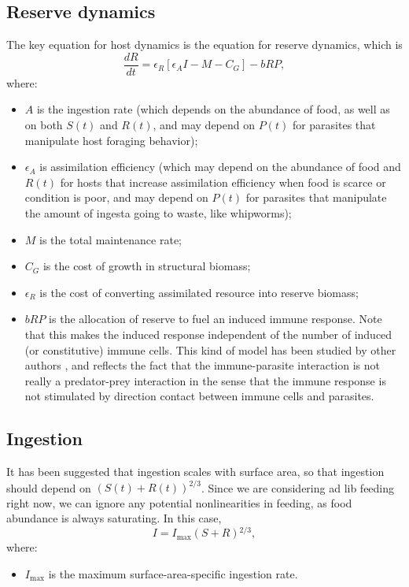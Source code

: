 \documentclass[11pt,reqno,final,pdftex]{amsart}\usepackage[]{graphicx}\usepackage[]{color}
\theoremstyle{plain}
\numberwithin{equation}{part}
\begin{document}
\subsection*{Reserve dynamics}
The key equation for host dynamics is the equation for reserve dynamics, which is
\begin{equation}
\frac{dR}{dt}=\epsilon _R\left[\epsilon _A I-M-C_G\right]-b R P,
\end{equation}
where:
\begin{itemize}
\item $A$ is the ingestion rate (which depends on the abundance of food, as well as on both $S(t)$ and $R(t)$, and may depend on $P(t)$ for parasites that manipulate host foraging behavior);
\item $\epsilon _A$ is assimilation efficiency (which may depend on the abundance of food and $R(t)$ for hosts that increase assimilation efficiency when food is scarce or condition is poor, and may depend on $P(t)$ for parasites that manipulate the amount of ingesta going to waste, like whipworms);
\item $M$ is the total maintenance rate;
\item $C_G$ is the cost of growth in structural biomass;
\item $\epsilon _R$ is the cost of converting assimilated resource into reserve biomass;
\item $bRP$ is the allocation of reserve to fuel an induced immune response. Note that this makes the induced response independent of the number of induced (or constitutive) immune cells. This kind of model has been studied by other authors \citep{Bonhoeffer1994,Alizon2005,Fenton2006,Hamilton2008}, and reflects the fact that the immune-parasite interaction is not really a predator-prey interaction in the sense that the immune response is not stimulated by direction contact between immune cells and parasites.
\end{itemize}

\subsection*{Ingestion}
It has been suggested that ingestion scales with surface area, so that ingestion should depend on $(S(t)+R(t))^{2/3}$. Since we are considering
ad lib feeding right now, we can ignore any potential nonlinearities in feeding, as food abundance is always saturating.
In this case,
\begin{equation}
I=I_{\max }(S+R){}^{2/3},
\end{equation}
where:
\begin{itemize}
\item $I_{\max }$ is the maximum surface-area-specific ingestion rate.
\end{itemize}
\end{document}
